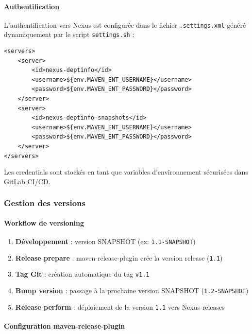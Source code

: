 \paragraph{Authentification}

L'authentification vers Nexus est configurée dans le fichier \texttt{.settings.xml} généré dynamiquement par le script \texttt{settings.sh} :

\vspace{0.3cm}
\begin{lstlisting}[language=enhancedxml, caption=Authentification Nexus]
<servers>
    <server>
        <id>nexus-deptinfo</id>
        <username>${env.MAVEN_ENT_USERNAME}</username>
        <password>${env.MAVEN_ENT_PASSWORD}</password>
    </server>
    <server>
        <id>nexus-deptinfo-snapshots</id>
        <username>${env.MAVEN_ENT_USERNAME}</username>
        <password>${env.MAVEN_ENT_PASSWORD}</password>
    </server>
</servers>
\end{lstlisting}

Les credentials sont stockés en tant que variables d'environnement sécurisées dans GitLab CI/CD.

\subsubsection{Gestion des versions}

\paragraph{Workflow de versioning}

\begin{enumerate}
    \item \textbf{Développement} : version SNAPSHOT (ex: \texttt{1.1-SNAPSHOT})
    \item \textbf{Release prepare} : maven-release-plugin crée la version release (\texttt{1.1})
    \item \textbf{Tag Git} : création automatique du tag \texttt{v1.1}
    \item \textbf{Bump version} : passage à la prochaine version SNAPSHOT (\texttt{1.2-SNAPSHOT})
    \item \textbf{Release perform} : déploiement de la version \texttt{1.1} vers Nexus releases
\end{enumerate}

\paragraph{Configuration maven-release-plugin}

